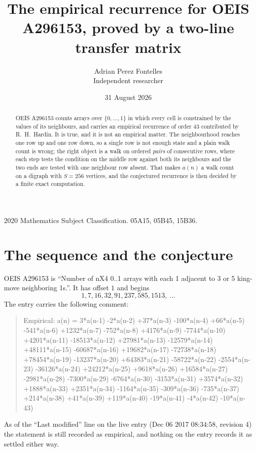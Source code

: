 \documentclass[11pt,a4paper]{article}
\title{The empirical recurrence for OEIS A296153, proved by a two-line transfer matrix}
\author{Adrian Perez Fontelles\\ \small Independent researcher}
\date{31 August 2026}
\theoremstyle{plain}
\theoremstyle{definition}
\begin{document}
\maketitle

\begin{abstract}
OEIS A296153 counts arrays over $\{0,\dots,1\}$ in which every cell is constrained by the
values of its neighbours, and carries an empirical recurrence of order $43$ contributed
by R.~H.~Hardin. It is true, and it is not an empirical matter. The neighbourhood reaches one
row up and one row down, so a single row is not enough state and a plain walk count
is wrong; the right object is a walk on ordered \emph{pairs} of consecutive rows, where
each step tests the condition on the middle row against both its neighbours and the two
ends are tested with one neighbour row absent. That makes $a(n)$ a walk count on a digraph
with $S=256$ vertices, and the conjectured recurrence is then decided by a finite exact
computation.
\end{abstract}

\noindent\small 2020 Mathematics Subject Classification. 05A15, 05B45, 15B36.\normalsize

\section{The sequence and the conjecture}

OEIS A296153 is ``Number of nX4 0..1 arrays with each 1 adjacent to 3 or 5 king-move neighboring 1s.''. It has offset $1$ and begins
\[
1, 7, 16, 32, 91, 237, 585, 1513,\ \dots
\]
The entry carries the following comment:
\begin{quote}\small
Empirical: a(n) = 3*a(n-1) -2*a(n-2) +37*a(n-3) -100*a(n-4) +66*a(n-5) -541*a(n-6) +1232*a(n-7) -752*a(n-8) +4176*a(n-9) -7744*a(n-10) +4201*a(n-11) -18513*a(n-12) +27981*a(n-13) -12579*a(n-14) +48111*a(n-15) -60687*a(n-16) +19682*a(n-17) -72738*a(n-18) +78454*a(n-19) -13237*a(n-20) +64383*a(n-21) -58722*a(n-22) -2554*a(n-23) -36126*a(n-24) +24212*a(n-25) +9618*a(n-26) +16584*a(n-27) -2981*a(n-28) -7300*a(n-29) -6764*a(n-30) -3153*a(n-31) +3574*a(n-32) +1888*a(n-33) +2351*a(n-34) -1164*a(n-35) -309*a(n-36) -735*a(n-37) +214*a(n-38) +41*a(n-39) +119*a(n-40) -19*a(n-41) -4*a(n-42) -10*a(n-43)
\end{quote}
As of the ``Last modified'' line on the live entry (Dec 06 2017 08:34:58, revision 4) the statement is
still recorded as empirical, and nothing on the entry records it as settled either way.
\end{document}
